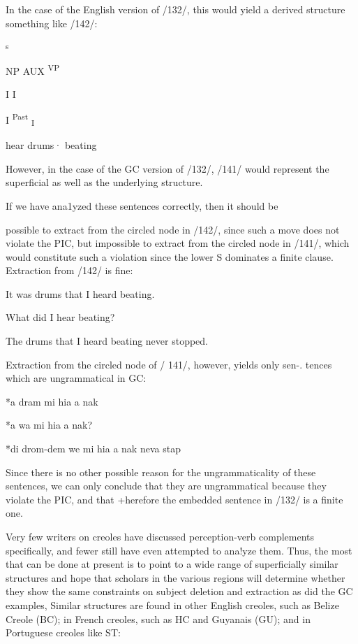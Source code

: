 In the case of the English version of /132/, this would yield a derived structure something like /142/:

\ea\label{ex:142}
 \textsuperscript{s} 
\glt
\z

  


    


 

NP AUX \textsuperscript{VP}

I I

I \textsuperscript{Past}\textsubscript{ }\textsubscript{I}

hear drums· beating

However, in the case of the GC version of /132/, /141/ would represent the superficial as well as the underlying structure.

If we have ana1yzed these sentences correctly, then it should be

possible to extract from the circled node in /142/, since such a move does not violate the PIC, but impossible to extract from the circled node in /141/, which would constitute such a violation since the lower S dominates a finite clause. Extraction from /142/ is fine:

\ea\label{ex:143}
 It was drums that I heard beating.
\glt
\z

\ea\label{ex:144}
 What did I hear beating?
\glt
\z

\ea\label{ex:145}
 The drums that I heard beating never stopped.
\glt
\z

Extraction from the circled node of / 141/, however, yields only sen{}-. tences which are ungrammatical in GC:

\ea\label{ex:146}
 *a dram mi hia a nak
\glt
\z

\ea\label{ex:147}
 *a wa mi hia a nak?
\glt
\z

\ea\label{ex:148}
 *di drom-dem we mi hia a nak neva stap
\glt
\z

Since there is no other possible reason for the ungrammaticality of these sentences, we can only conclude that they are ungrammatical because they violate the PIC, and that +herefore the embedded sentence in /132/ is a finite one.


Very few writers on creoles have discussed perception-verb com\-plements specifically, and fewer still have even attempted to ana!yze them. Thus, the most that can be done at present is to point to a wide range of superficially similar structures and hope that scholars in the various regions will determine whether they show the same constraints on subject deletion and extraction as did the GC examples, Similar structures are found in other English creoles, such as Belize Creole (BC); in French creoles, such as HC and Guyanais (GU); and in Portu\-guese creoles like ST:

